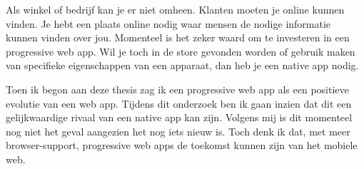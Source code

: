 Als winkel of bedrijf kan je er niet omheen. Klanten moeten je online kunnen vinden. Je hebt een plaats online nodig waar mensen de nodige informatie kunnen vinden over jou. Momenteel is het zeker waard om te investeren in een progressive web app. Wil je toch in de store gevonden worden of gebruik maken van specifieke eigenschappen van een apparaat, dan heb je een native app nodig.

Toen ik begon aan deze thesis zag ik een progressive web app als een positieve evolutie van een web app. Tijdens dit onderzoek ben ik gaan inzien dat dit een gelijkwaardige rivaal van een native app kan zijn. Volgens mij is dit momenteel nog niet het geval aangezien het nog iets nieuw is. Toch denk ik dat, met meer browser-support, progressive web apps de toekomst kunnen zijn van het mobiele web.






